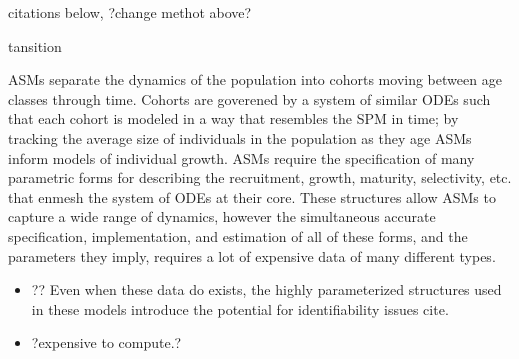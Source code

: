 
{\color{red} citations below, ?change methot above?}

{\color{red} tansition }

%
ASMs separate the dynamics of the population into cohorts moving between age 
classes through time. %
Cohorts are goverened by a system of similar ODEs such that 
each cohort is modeled in a way that resembles the SPM in time; by
tracking the average size of individuals in the population as they age 
ASMs inform models of individual growth. ASMs require the 
specification of many parametric forms for describing the recruitment, 
growth, maturity, selectivity, etc. that enmesh the system of ODEs at their 
core. These structures allow ASMs to capture a wide range of dynamics, however 
the simultaneous accurate specification, implementation, and estimation of all of 
these forms, and the parameters they imply, requires a lot of expensive data 
of many different types. 
%

%
{\color{red}
\begin{itemize}
\item ?? Even when these data do exists, the highly parameterized structures 
used in these models introduce the potential for identifiability issues {\color{red} cite}.
\item ?expensive to compute.?
\end{itemize}
}

